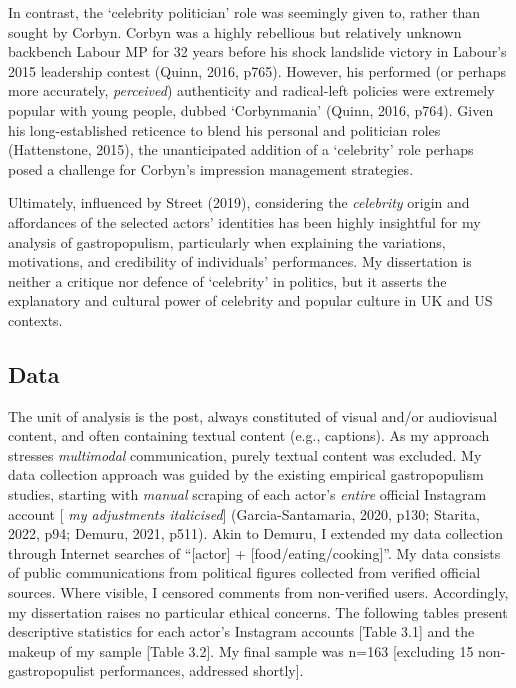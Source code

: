 \documentclass[a4paper, nobind]{templates/ociamthesis}
\begin{document}
In contrast, the `celebrity politician' role was seemingly given to, rather than sought by Corbyn. Corbyn was a highly rebellious but relatively unknown backbench Labour MP for 32 years before his shock landslide victory in Labour's 2015 leadership contest (Quinn, 2016, p765). However, his performed (or perhaps more accurately, \emph{perceived}) authenticity and radical-left policies were extremely popular with young people, dubbed `Corbynmania' (Quinn, 2016, p764). Given his long-established reticence to blend his personal and politician roles (Hattenstone, 2015), the unanticipated addition of a `celebrity' role perhaps posed a challenge for Corbyn's impression management strategies.

Ultimately, influenced by Street (2019), considering the \emph{celebrity} origin and affordances of the selected actors' identities has been highly insightful for my analysis of gastropopulism, particularly when explaining the variations, motivations, and credibility of individuals' performances. My dissertation is neither a critique nor defence of `celebrity' in politics, but it asserts the explanatory and cultural power of celebrity and popular culture in UK and US contexts.

\hypertarget{data}{%
\subsection*{Data}\label{data}}

The unit of analysis is the post, always constituted of visual and/or audiovisual content, and often containing textual content (e.g., captions). As my approach stresses \emph{multimodal} communication, purely textual content was excluded. My data collection approach was guided by the existing empirical gastropopulism studies, starting with \emph{manual} scraping of each actor's \emph{entire} official Instagram account {[} \emph{my adjustments italicised}{]} (Garcia-Santamaria, 2020, p130; Starita, 2022, p94; Demuru, 2021, p511). Akin to Demuru, I extended my data collection through Internet searches of ``{[}actor{]} + {[}food/eating/cooking{]}''. My data consists of public communications from political figures collected from verified official sources. Where visible, I censored comments from non-verified users. Accordingly, my dissertation raises no particular ethical concerns. The following tables present descriptive statistics for each actor's Instagram accounts {[}Table 3.1{]} and the makeup of my sample {[}Table 3.2{]}. My final sample was n=163 {[}excluding 15 non-gastropopulist performances, addressed shortly{]}.
\end{document}
